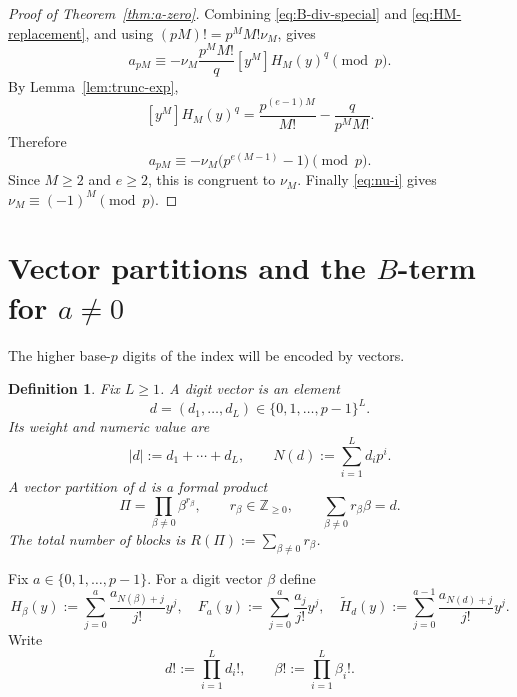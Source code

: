 \documentclass[11pt]{amsart}
\numberwithin{equation}{section}
\newtheorem{definition}[definition]{Definition}
\begin{document}
\begin{proof}[Proof of Theorem~\ref{thm:a-zero}]
Combining \eqref{eq:B-div-special} and \eqref{eq:HM-replacement}, and using $(pM)!=p^MM!\nu_M$, gives
\[
        a_{pM}\equiv -\nu_M\frac{p^MM!}{q}[y^M]H_M(y)^q\pmod p.
\]
By Lemma~\ref{lem:trunc-exp},
\[
        [y^M]H_M(y)^q=\frac{p^{(e-1)M}}{M!}-\frac{q}{p^MM!}.
\]
Therefore
\[
        a_{pM}\equiv -\nu_M\bigl(p^{e(M-1)}-1\bigr)\pmod p.
\]
Since $M\ge2$ and $e\ge2$, this is congruent to $\nu_M$.  Finally \eqref{eq:nu-i} gives $\nu_M\equiv(-1)^M\pmod p$.
\end{proof}

\section{Vector partitions and the \texorpdfstring{$B$}{B}-term for \texorpdfstring{$a\ne0$}{a not equal 0}}\label{sec:vector-partitions}
The higher base-$p$ digits of the index will be encoded by vectors.

\begin{definition}\label{def:digit-vector}
Fix $L\ge1$.  A digit vector is an element
\[
        d=(d_1,\ldots,d_L)\in\{0,1,\ldots,p-1\}^L.
\]
Its weight and numeric value are
\[
        |d|:=d_1+\cdots+d_L,
        \qquad
        N(d):=\sum_{i=1}^Ld_ip^i.
\]
A vector partition of $d$ is a formal product
\[
        \Pi=\prod_{\beta\ne0}\beta^{r_\beta},
        \qquad r_\beta\in\mathbb Z_{\ge0},
        \qquad \sum_{\beta\ne0}r_\beta\beta=d.
\]
The total number of blocks is $R(\Pi):=\sum_{\beta\ne0}r_\beta$.
\end{definition}

Fix $a\in\{0,1,\ldots,p-1\}$.  For a digit vector $\beta$ define
\[
        H_\beta(y):=\sum_{j=0}^a\frac{a_{N(\beta)+j}}{j!}y^j,
        \quad
        F_a(y):=\sum_{j=0}^a\frac{a_j}{j!}y^j,
        \quad
        \widetilde H_d(y):=\sum_{j=0}^{a-1}\frac{a_{N(d)+j}}{j!}y^j.
\]
Write
\[
        d!:=\prod_{i=1}^Ld_i!,
        \qquad
        \beta!:=\prod_{i=1}^L\beta_i!.
\]
\end{document}
